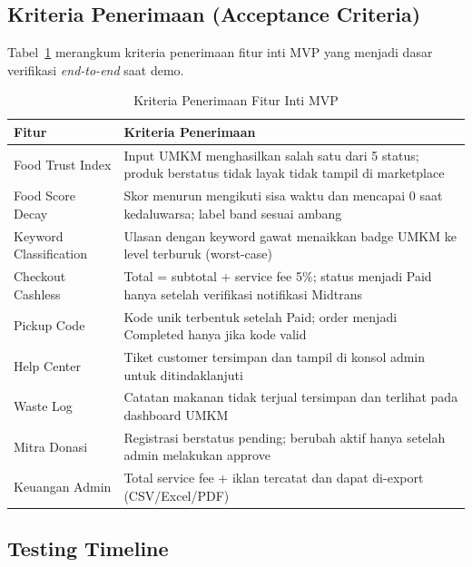 \subsection{Kriteria Penerimaan (Acceptance Criteria)}

Tabel~\ref{tab:acceptance} merangkum kriteria penerimaan fitur inti MVP yang menjadi dasar
verifikasi \textit{end-to-end} saat demo.

\begin{table}[htbp]
\centering
\caption{Kriteria Penerimaan Fitur Inti MVP}
\label{tab:acceptance}
\small
\begin{tabularx}{\textwidth}{|l|X|}
\hline
\textbf{Fitur} & \textbf{Kriteria Penerimaan} \\
\hline
Food Trust Index & Input UMKM menghasilkan salah satu dari 5 status; produk berstatus tidak layak tidak tampil di marketplace \\
\hline
Food Score Decay & Skor menurun mengikuti sisa waktu dan mencapai 0 saat kedaluwarsa; label band sesuai ambang \\
\hline
Keyword Classification & Ulasan dengan keyword gawat menaikkan badge UMKM ke level terburuk (worst-case) \\
\hline
Checkout Cashless & Total = subtotal + service fee 5\%; status menjadi Paid hanya setelah verifikasi notifikasi Midtrans \\
\hline
Pickup Code & Kode unik terbentuk setelah Paid; order menjadi Completed hanya jika kode valid \\
\hline
Help Center & Tiket customer tersimpan dan tampil di konsol admin untuk ditindaklanjuti \\
\hline
Waste Log & Catatan makanan tidak terjual tersimpan dan terlihat pada dashboard UMKM \\
\hline
Mitra Donasi & Registrasi berstatus pending; berubah aktif hanya setelah admin melakukan approve \\
\hline
Keuangan Admin & Total service fee + iklan tercatat dan dapat di-export (CSV/Excel/PDF) \\
\hline
\end{tabularx}
\end{table}

\subsection{Testing Timeline}

